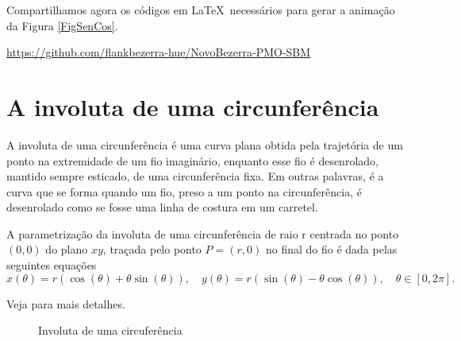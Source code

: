 \documentclass[10pt]{article}
\theoremstyle{plain} %
\theoremstyle{definition} %
\theoremstyle{remark} %
\begin{document}
Compartilhamos agora os códigos em  \LaTeX\ necessários para gerar a animação da Figura \ref{FigSenCos}.


\href{https://github.com/flankbezerra-hue/NovoBezerra-PMO-SBM}{https://github.com/flankbezerra-hue/NovoBezerra-PMO-SBM}

\section{A involuta de uma circunferência}\label{SecInvoluta}

\begin{definition}
A involuta de uma circunferência é uma curva plana obtida pela trajetória de um ponto na extremidade de um fio imaginário, enquanto esse fio é desenrolado, mantido sempre esticado, de uma circunferência fixa. Em outras palavras, é a curva que se forma quando um fio, preso a um ponto na circunferência, é desenrolado como se fosse uma linha de costura em um carretel.     
\end{definition}


\begin{theorem}
A parametrização da involuta de uma circunferência de raio r centrada no ponto $(0,0)$ do plano $xy$, traçada pelo ponto $P=(r,0)$ no final do fio é dada pelas seguintes equações
\[
x(\theta)=r(\cos(\theta)+\theta\sin(\theta)),\quad y(\theta)=r(\sin(\theta)-\theta\cos(\theta)),\quad \theta\in[0,2\pi].
\]
\end{theorem}

Veja \cite{ASN} para mais detalhes.


\begin{figure}[!htp]
\centering
\begin{animateinline}[poster = last, controls]{10}
\newframe
{}
\newframe
\end{animateinline}
\caption{Involuta de uma circuferência}
\label{FigInv}
\end{figure}
\end{document}
